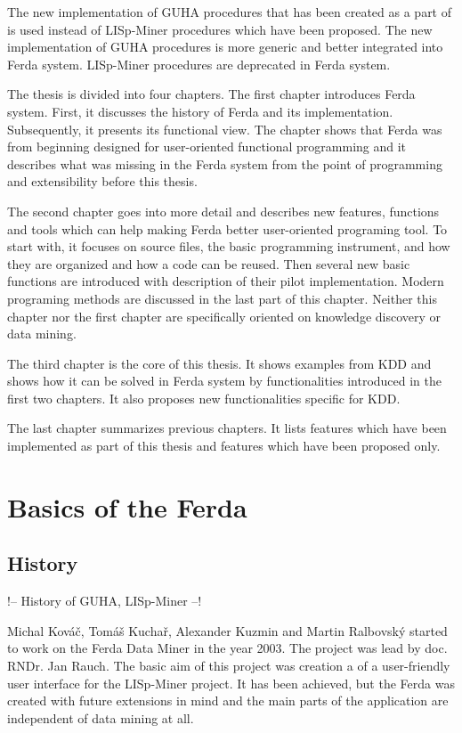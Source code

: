 \documentclass[a4paper,12pt]{book}
\begin{document}
The new implementation of GUHA procedures that has been created as a part of \cite[diploma thesis of Tomáš Kuchař]{thesisKuchar} is used instead of LISp-Miner procedures which have been proposed. The new implementation of GUHA procedures is more generic and better integrated into Ferda system. LISp-Miner procedures are deprecated in Ferda system.

The thesis is divided into four chapters. The first chapter introduces Ferda system. First, it discusses the history of Ferda and its implementation. Subsequently, it presents its functional view. The chapter shows that Ferda was from beginning designed for user-oriented functional programming and it describes what was missing in the Ferda system from the point of programming and extensibility before this thesis.

The second chapter goes into more detail and describes new features, functions and tools which can help making Ferda better user-oriented programing tool. To start with, it focuses on source files, the basic programming instrument, and how they are organized and how a code can be reused. Then several new basic functions are introduced with description of their pilot implementation. Modern programing methods are discussed in the last part of this chapter. Neither this chapter nor the first chapter are specifically oriented on knowledge discovery or data mining.

The third chapter is the core of this thesis. It shows examples from KDD and shows how it can be solved in Ferda system by functionalities introduced in the first two chapters. It also proposes new functionalities specific for KDD.

The last chapter summarizes previous chapters. It lists features which have been implemented as part of this thesis and features which have been proposed only.

\chapter{Basics of the Ferda}
\section{History}
!-- History of GUHA, LISp-Miner --!

Michal Kováč, Tomáš Kuchař, Alexander Kuzmin and Martin Ralbovský started to work on the Ferda Data Miner in the year 2003. The project was lead by doc. RNDr. Jan Rauch. The basic aim of this project was creation a of a user-friendly user interface for the LISp-Miner project. It has been achieved, but the Ferda was created with future extensions in mind and the main parts of the application are independent of data mining at all.
\end{document}
